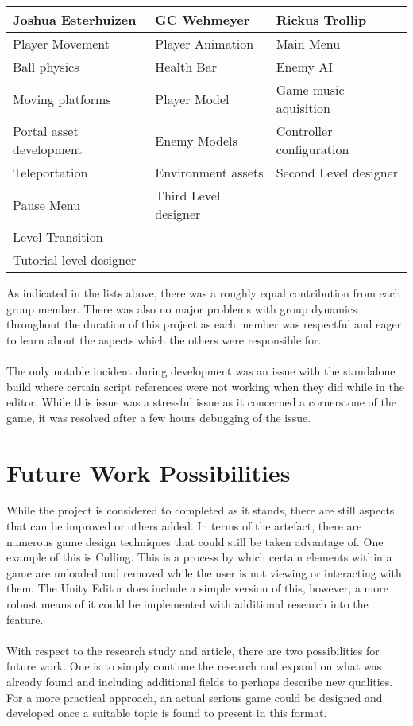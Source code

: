 \begin{table}[H]
\begin{tabular}{l|l|l}
\hline
Joshua Esterhuizen       & GC Wehmeyer          & Rickus Trollip           \\ \hline
Player Movement          & Player Animation     & Main Menu                \\
Ball physics             & Health Bar           & Enemy AI                 \\
Moving platforms         & Player Model         & Game music aquisition    \\
Portal asset development & Enemy Models         & Controller configuration \\
Teleportation            & Environment assets   & Second Level designer    \\
Pause Menu               & Third Level designer &                          \\
Level Transition         &                      &                          \\
Tutorial level designer  &                      &                          \\ \hline
\end{tabular}
\end{table}

\noindent As indicated in the lists above, there was a roughly equal contribution from each group member. There was also no major problems with group dynamics throughout the duration of this project as each member was respectful and eager to learn about the aspects which the others were responsible for. 
\\\\
The only notable incident during development was an issue with the standalone build where certain script references were not working when they did while in the editor. While this issue was a stressful issue as it concerned a cornerstone of the game, it was resolved after a few hours debugging of the issue. 

\section{Future Work Possibilities}
While the project is considered to completed as it stands, there are still aspects that can be improved or others added. In terms of the artefact, there are numerous game design techniques that could still be taken advantage of. One example of this is Culling. This is a process by which certain elements within a game are unloaded and removed while the user is not viewing or interacting with them. The Unity Editor does include a simple version of this, however, a more robust means of it could be implemented with additional research into the feature. 
\\\\
With respect to the research study and article, there are two possibilities for future work. One is to simply continue the research and expand on what was already found and including additional fields to perhaps describe new qualities. For a more practical approach, an actual serious game could be designed and developed once a suitable topic is found to present in this format.

